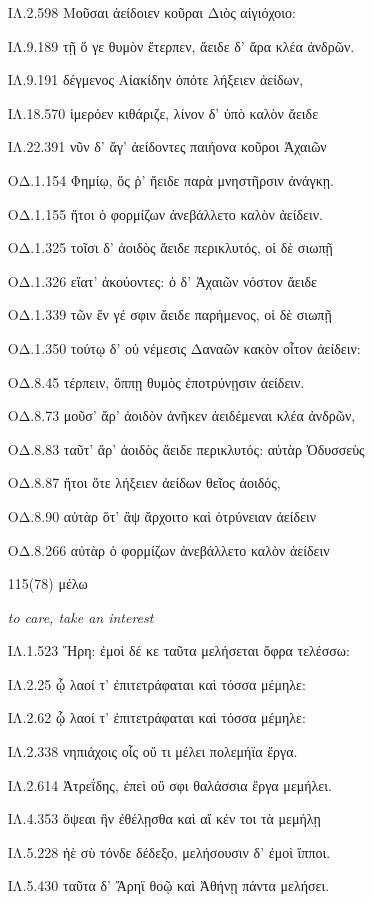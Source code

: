 \begin{enumerate}
{ΙΛ.2.598 Μοῦσαι ἀείδοιεν κοῦραι Διὸς αἰγιόχοιο:

ΙΛ.9.189 τῇ ὅ γε θυμὸν ἔτερπεν, ἄειδε δ' ἄρα κλέα ἀνδρῶν.

ΙΛ.9.191 δέγμενος Αἰακίδην ὁπότε λήξειεν ἀείδων,

ΙΛ.18.570 ἱμερόεν κιθάριζε, λίνον δ' ὑπὸ καλὸν ἄειδε

ΙΛ.22.391 νῦν δ' ἄγ' ἀείδοντες παιήονα κοῦροι Ἀχαιῶν

ΟΔ.1.154 Φημίῳ, ὅς ῥ' ἤειδε παρὰ μνηστῆρσιν ἀνάγκῃ.

ΟΔ.1.155 ἤτοι ὁ φορμίζων ἀνεβάλλετο καλὸν ἀείδειν.

ΟΔ.1.325 τοῖσι δ' ἀοιδὸς ἄειδε περικλυτός, οἱ δὲ σιωπῇ

ΟΔ.1.326 εἵατ' ἀκούοντες: ὁ δ' Ἀχαιῶν νόστον ἄειδε

ΟΔ.1.339 τῶν ἕν γέ σφιν ἄειδε παρήμενος, οἱ δὲ σιωπῇ

ΟΔ.1.350 τούτῳ δ' οὐ νέμεσις Δαναῶν κακὸν οἶτον ἀείδειν:

ΟΔ.8.45 τέρπειν, ὅππῃ θυμὸς ἐποτρύνῃσιν ἀείδειν.

ΟΔ.8.73 μοῦσ' ἄρ' ἀοιδὸν ἀνῆκεν ἀειδέμεναι κλέα ἀνδρῶν,

ΟΔ.8.83 ταῦτ' ἄρ' ἀοιδὸς ἄειδε περικλυτός: αὐτὰρ Ὀδυσσεὺς

ΟΔ.8.87 ἤτοι ὅτε λήξειεν ἀείδων θεῖος ἀοιδός,

ΟΔ.8.90 αὐτὰρ ὅτ' ἂψ ἄρχοιτο καὶ ὀτρύνειαν ἀείδειν

ΟΔ.8.266 αὐτὰρ ὁ φορμίζων ἀνεβάλλετο καλὸν ἀείδειν

}

\clearpage
\item[\large 115(78)]{\large \g μέλω}

\hspace{0.2cm} \textit{ to care, take an interest }

{\g
ΙΛ.1.523 Ἥρη: ἐμοὶ δέ κε ταῦτα μελήσεται ὄφρα τελέσσω:

ΙΛ.2.25 ᾧ λαοί τ' ἐπιτετράφαται καὶ τόσσα μέμηλε:

ΙΛ.2.62 ᾧ λαοί τ' ἐπιτετράφαται καὶ τόσσα μέμηλε:

ΙΛ.2.338 νηπιάχοις οἷς οὔ τι μέλει πολεμήϊα ἔργα.

ΙΛ.2.614 Ἀτρεΐδης, ἐπεὶ οὔ σφι θαλάσσια ἔργα μεμήλει.

ΙΛ.4.353 ὄψεαι ἢν ἐθέλῃσθα καὶ αἴ κέν τοι τὰ μεμήλῃ

ΙΛ.5.228 ἠὲ σὺ τόνδε δέδεξο, μελήσουσιν δ' ἐμοὶ ἵπποι.

ΙΛ.5.430 ταῦτα δ' Ἄρηϊ θοῷ καὶ Ἀθήνῃ πάντα μελήσει.

}
\end{enumerate}
